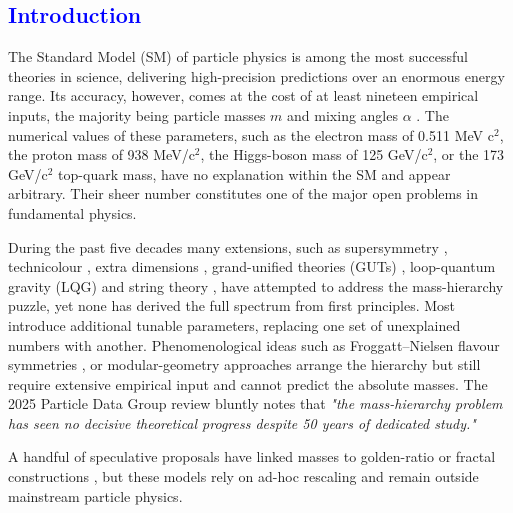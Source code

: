 \documentclass[%
 amsmath,amssymb,
 aps,
prb,
floatfix, showkeys
]{revtex4-2}
\newcommand{\modif}[1]{\textcolor{blue}{#1}}
\begin{document}
\modif{
  \section{ Introduction}
\label{sec-1}
}
The  Standard Model (SM) of particle physics
\cite{SM-ref,weinberg-book,Weinberg1979} is among the most successful theories in science,
delivering high-precision predictions over an enormous energy range.
 Its accuracy, however, comes at the cost of at least nineteen empirical inputs,
the majority being particle masses $m$ and mixing angles $\alpha$ \cite{PDG2022,PDG2025}.
The numerical values of these parameters, such as the electron mass of
0.511 MeV c$^2$, the proton mass of 938 MeV/c$^2$, the Higgs-boson mass of 125 GeV/c$^2$,
or the 173 GeV/c$^2$ top-quark mass, have no explanation within the SM and appear arbitrary. 
 Their sheer number constitutes one of the major open problems in fundamental physics. 

 
 During the past five decades many extensions, such as supersymmetry \cite{dine-1993,Wess1974},
technicolour \cite{Susskind1979,hill-2003,technicolor-2015}, extra dimensions \cite{Randall1999},
grand-unified theories (GUTs) \cite{grand-uni-th-2015},
loop-quantum gravity (LQG) \cite{Rovelli2004,loop-qg} and
string theory \cite{polchinski-1998}, have attempted
to address the mass-hierarchy puzzle, yet none has derived the full spectrum
from first principles. Most introduce additional tunable parameters,
replacing one set of unexplained numbers with another. 
Phenomenological ideas such as Froggatt–Nielsen flavour symmetries
\cite{frog-1979,fritz-2000}, or modular-geometry approaches \cite{petcov}
arrange the hierarchy but still require extensive empirical input and cannot
predict the absolute masses.
The 2025 Particle Data Group review \cite{PDG2025} bluntly
notes that \textit{"the mass-hierarchy problem has seen no decisive theoretical progress
despite 50 years of dedicated study."}


A handful of speculative proposals have linked masses to golden-ratio or fractal
constructions \cite{koide-1983,eln-2002,eln-2002-1,cascade-2003}, but these models rely on ad-hoc
rescaling and remain outside mainstream particle physics.
\end{document}
